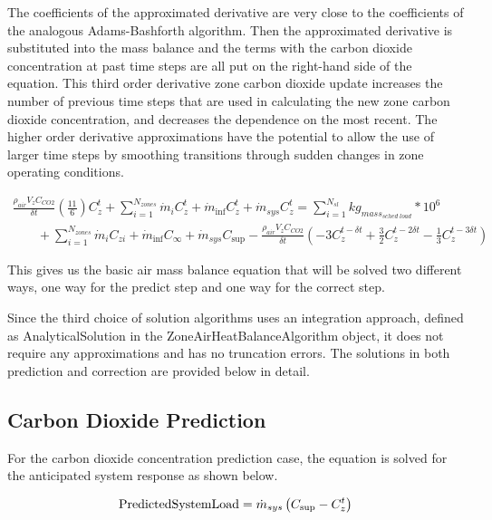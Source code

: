 The coefficients of the approximated derivative are very close to the coefficients of the analogous Adams-Bashforth algorithm. Then the approximated derivative is substituted into the mass balance and the terms with the carbon dioxide concentration at past time steps are all put on the right-hand side of the equation. This third order derivative zone carbon dioxide update increases the number of previous time steps that are used in calculating the new zone carbon dioxide concentration, and decreases the dependence on the most recent. The higher order derivative approximations have the potential to allow the use of larger time steps by smoothing transitions through sudden changes in zone operating conditions.

\begin{equation}
\begin{array}{l}\frac{{{\rho_{air}}{V_z}{C_{CO2}}}}{{\delta t}}\left( {\frac{{11}}{6}} \right)C_z^t + \sum\limits_{i = 1}^{{N_{zones}}} {{{\dot m}_i}} C_z^t + {{\dot m}_{\inf }}C_z^t + {{\dot m}_{sys}}C_z^t = \sum\limits_{i = 1}^{{N_{sl}}} {k{g_{mas{s_{sched\;load}}}}} *{10^6}\\\;\;\;\;\;\;\; + \sum\limits_{i = 1}^{{N_{zones}}} {{{\dot m}_i}} {C_{zi}} + {{\dot m}_{\inf }}{C_\infty } + {{\dot m}_{sys}}{C_{\sup }} - \frac{{{\rho_{air}}{V_z}{C_{CO2}}}}{{\delta t}}( - 3C_z^{t - \delta t} + \frac{3}{2}C_z^{t - 2\delta t} - \frac{1}{3}C_z^{t - 3\delta t})\end{array}
\end{equation}

This gives us the basic air mass balance equation that will be solved two different ways, one way for the predict step and one way for the correct step.

Since the third choice of solution algorithms uses an integration approach, defined as AnalyticalSolution in the ZoneAirHeatBalanceAlgorithm object, it does not require any approximations and has no truncation errors. The solutions in both prediction and correction are provided below in detail.

\subsection{Carbon Dioxide Prediction}\label{carbon-dioxide-prediction}

For the carbon dioxide concentration prediction case, the equation is solved for the anticipated system response as shown below.

\begin{equation}
{\rm{PredictedSystemLoad}} = {\dot m_{sys}}\left( {{C_{\sup }} - C_z^t} \right)
\end{equation}

